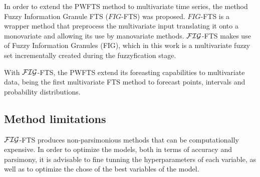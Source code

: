 In order to extend the PWFTS method to multivariate time series, the method Fuzzy Information Granule FTS ($FIG$-FTS) was proposed. $FIG$-FTS is a wrapper method that preprocess the multivariate input translating it onto a monovariate and allowing its use by manovariate methods. $\mathcal{FIG}$-FTS makes use of Fuzzy Information Granules (FIG), which in this work is a multivariate fuzzy set incrementally created during the fuzzyfication stage.

With $\mathcal{FIG}$-FTS, the PWFTS extend its foreasting capabilities to multivariate data, being the first multivariate FTS method to forecast points, intervals and probability distributions. 

\subsection{Method limitations}

$\mathcal{FIG}$-FTS produces non-parsimonious methods that can be computationally expensive. In order to optimize the models, both in terms of accuracy and parsimony, it is advisable to fine tunning the hyperparameters of each variable, as well as to optimize the chose of the best variables of the model.